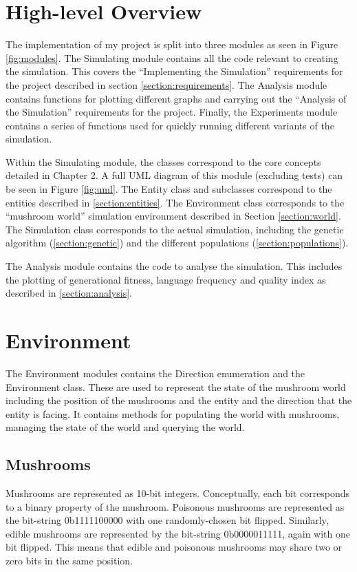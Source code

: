 \documentclass[12pt,a4paper,twoside,openright]{report}
\begin{document}
\section{High-level Overview}

The implementation of my project is split into three modules as seen in Figure \ref{fig:modules}. The Simulating module contains all the code relevant to creating the simulation. This covers the ``Implementing the Simulation'' requirements for the project described in section \ref{section:requirements}. The Analysis module contains functions for plotting different graphs and carrying out the ``Analysis of the Simulation'' requirements for the project. Finally, the Experiments module contains a series of functions used for quickly running different variants of the simulation. 

Within the Simulating module, the classes correspond to the core concepts detailed in Chapter 2. A full UML diagram of this module (excluding tests) can be seen in Figure \ref{fig:uml}. The Entity class and subclasses correspond to the entities described in \ref{section:entities}. The Environment class corresponds to the ``mushroom world'' simulation environment described in Section \ref{section:world}. The Simulation class corresponds to the actual simulation, including the genetic algorithm (\ref{section:genetic}) and the different populations (\ref{section:populations}).

The Analysis module contains the code to analyse the simulation. This includes the plotting of generational fitness, language frequency and quality index as described in \ref{section:analysis}.

\section{Environment}

The Environment modules contains the Direction enumeration and the Environment class. These are used to represent the state of the mushroom world including the position of the mushrooms and the entity and the direction that the entity is facing. It contains methods for populating the world with mushrooms, managing the state of the world and querying the world.

\subsection{Mushrooms}\label{section:mushrooms}

Mushrooms are represented as 10-bit integers. Conceptually, each bit corresponds to a binary property of the mushroom. Poisonous mushrooms are represented as the bit-string 0b1111100000 with one randomly-chosen bit flipped. Similarly, edible mushrooms are represented by the bit-string 0b0000011111, again with one bit flipped. This means that edible and poisonous mushrooms may share two or zero bits in the same position.
\end{document}
